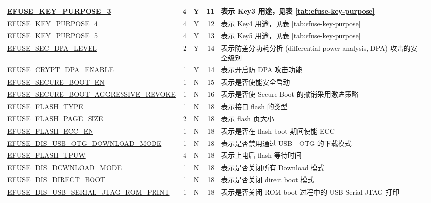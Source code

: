 \begin{longtable}[l]{ |m{8.2cm}|r|c|r|m{9.3cm}| }
    \hline
    \hyperref[fielddesc:EFUSEKEYPURPOSE3]{EFUSE\_KEY\_PURPOSE\_3} & 4 & Y & 11 & {表示 Key3 用途，见表 \ref{tab:efuse-key-purpose}} \\
    \hline
    \hyperref[fielddesc:EFUSEKEYPURPOSE4]{EFUSE\_KEY\_PURPOSE\_4} & 4 & Y & 12 & {表示 Key4 用途，见表 \ref{tab:efuse-key-purpose}} \\
    \hline
    \hyperref[fielddesc:EFUSEKEYPURPOSE5]{EFUSE\_KEY\_PURPOSE\_5} & 4 & Y & 13 & {表示 Key5 用途，见表 \ref{tab:efuse-key-purpose}} \\
    \hline
    \hyperref[fielddesc:EFUSESECDPALEVEL]{EFUSE\_SEC\_DPA\_LEVEL} & 2 & Y & 14 & 表示防差分功耗分析 (differential power analysis, DPA) 攻击的安全级别 \\
    \hline
    \hyperref[fielddesc:EFUSECRYPTDPAENABLE]{EFUSE\_CRYPT\_DPA\_ENABLE} & 1 & Y & 14 & 表示开启防 DPA 攻击功能 \\
    \hline
    \hyperref[fielddesc:EFUSESECUREBOOTEN]{EFUSE\_SECURE\_BOOT\_EN} & 1 & N & 15 & 表示是否使能安全启动 \\
    \hline
    \hyperref[fielddesc:EFUSESECUREBOOTAGGRESSIVEREVOKE]{EFUSE\_SECURE\_BOOT\_AGGRESSIVE\_REVOKE} & 1 & N & 16 & 表示是否使 Secure Boot 的撤销采用激进策略 \\
    \hline
    \hyperref[fielddesc:EFUSEFLASHTYPE]{EFUSE\_FLASH\_TYPE} & 1 & N & 18 & 表示接口 flash 的类型 \\
    \hline
    \hyperref[fielddesc:EFUSEFLASHPAGESIZE]{EFUSE\_FLASH\_PAGE\_SIZE} & 2 & N & 18 & 表示 flash 页大小 \\
    \hline
    \hyperref[fielddesc:EFUSEFLASHECCEN]{EFUSE\_FLASH\_ECC\_EN} & 1 & N & 18 & 表示是否在 flash boot 期间使能 ECC \\
    \hline
    \hyperref[fielddesc:EFUSEDISUSBOTGDOWNLOADMODE]{EFUSE\_DIS\_USB\_OTG\_DOWNLOAD\_MODE} & 1 & N & 18 & 表示是否禁用通过 USB－OTG 的下载模式 \\
    \hline
    \hyperref[fielddesc:EFUSEFLASHTPUW]{EFUSE\_FLASH\_TPUW} & 4 & N & 18 & 表示上电后 flash 等待时间 \\
    \hline
    \hyperref[fielddesc:EFUSEDISDOWNLOADMODE]{EFUSE\_DIS\_DOWNLOAD\_MODE} & 1 & N & 18 & 表示是否关闭所有 Download 模式\\
    \hline
    \hyperref[fielddesc:EFUSEDISDIRECTBOOT]{EFUSE\_DIS\_DIRECT\_BOOT} & 1 & N & 18 & 表示是否关闭 direct boot 模式\\
    \hline
    \hyperref[fielddesc:EFUSEDISUSBSERIALJTAGROMPRINT]{EFUSE\_DIS\_USB\_SERIAL\_JTAG\_ROM\_PRINT} & 1 & N & 18 & 表示是否关闭 ROM boot 过程中的 USB-Serial-JTAG 打印 \\

\end{longtable}
